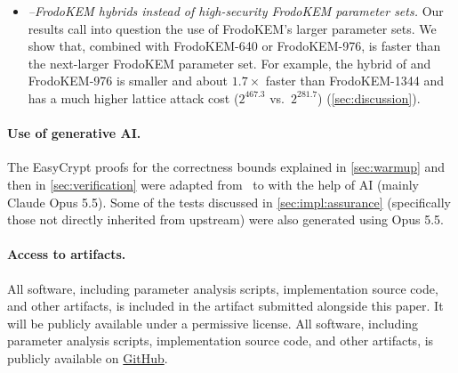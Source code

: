 \begin{itemize}
    most expensive operation, favors \kaiburr (\cref{sec:benchmarks}).
  \item \emph{\kaiburr--FrodoKEM hybrids instead of high-security FrodoKEM parameter sets.} Our results call into question
    the use of FrodoKEM's larger parameter sets. We show that, combined with FrodoKEM-640 or
    FrodoKEM-976, \kaiburr is faster than the next-larger FrodoKEM parameter set. For example, the hybrid of  and
    FrodoKEM-976 is smaller and about $1.7\times$ faster than FrodoKEM-1344 and has a much higher lattice attack cost ($2^{467.3}$
    vs.\ $2^{281.7}$) (\cref{sec:discussion}).
\end{itemize}

\paragraph{Use of generative AI.}
The EasyCrypt proofs for the correctness bounds explained in \cref{sec:warmup} and then in \cref{sec:verification}
were adapted from~\cite{CCS:BKLSS25} to \kaiburr with the help of AI (mainly Claude Opus 5.5). Some of the tests discussed in \cref{sec:impl:assurance}
(specifically those not directly inherited from upstream) were also generated using Opus 5.5. 

\paragraph{Access to artifacts.}
\makeatletter
\if@submission
All software, including parameter analysis scripts, implementation source code, and other artifacts, is 
included in the artifact submitted alongside this paper. It will be publicly available under a permissive license.
\else
All software, including parameter analysis scripts, implementation source code, and other artifacts, is publicly available on \href{https://github.com/cryptojedi/kaiburr}{GitHub}.
\fi
\makeatother
